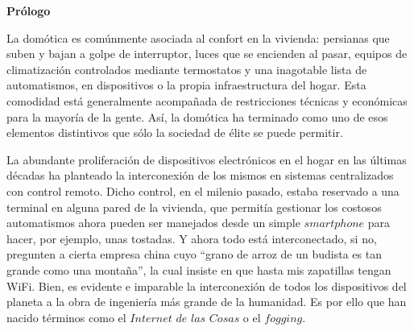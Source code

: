 
\newpage

\thispagestyle{empty}
\begin{center}

{\bf \Huge Prólogo}
\end{center}
\vspace{1cm}


La domótica es comúnmente asociada al confort en la vivienda: persianas que suben y bajan a golpe de interruptor, luces que se encienden al pasar, equipos de climatización controlados mediante termostatos y una inagotable lista de automatismos, en dispositivos o la propia infraestructura del hogar. Esta comodidad está generalmente acompañada de restricciones técnicas y económicas para la mayoría de la gente. Así, la domótica ha terminado como uno de esos elementos distintivos que sólo la sociedad de élite se puede permitir.

\vspace{0.5cm}

La abundante proliferación de dispositivos electrónicos en el hogar en las últimas décadas ha planteado la interconexión de los mismos en sistemas centralizados con control remoto. Dicho control, en el milenio pasado, estaba reservado a una terminal en alguna pared de la vivienda, que permitía gestionar los costosos automatismos ahora pueden ser manejados desde un simple $smartphone$ para hacer, por ejemplo, unas tostadas.
Y ahora todo está interconectado, si no, pregunten a cierta empresa china cuyo “grano de arroz de un budista es tan grande como una montaña”, la cual insiste en que hasta mis zapatillas tengan WiFi. Bien, es evidente e imparable la interconexión de todos los dispositivos del planeta a la obra de ingeniería más grande de la humanidad. Es por ello que han nacido términos como el $Internet$ $de$ $las$ $Cosas$ o el $fogging$.

\vspace{0.5cm}

